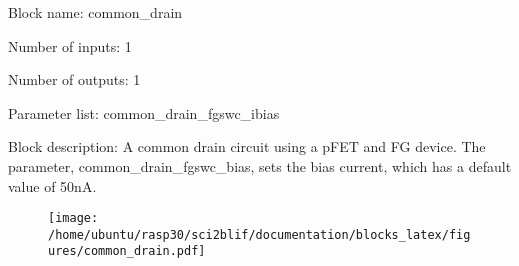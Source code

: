 \pagebreak

Block name: common\_drain

Number of inputs: 1

Number of outputs: 1

Parameter list: common\_drain\_fgswc\_ibias

Block description: 
A common drain circuit using a pFET and FG device. The parameter, common\_drain\_fgswc\_bias, sets the bias current, which has a default value of 50nA.

\begin{figure}[H]  %
\texttt{[image: /home/ubuntu/rasp30/sci2blif/documentation/blocks\_latex/figures/common\_drain.pdf]}
\end{figure}

